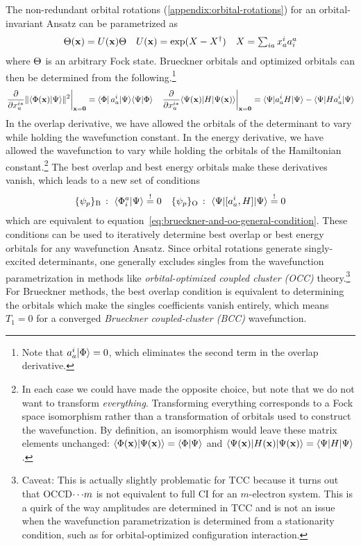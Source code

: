 \documentclass[11pt]{article}
\numberwithin{equation}{section}
\begin{document}
\begin{rmk}
The non-redundant orbital rotations (\cref{appendix:orbital-rotations}) for an orbital-invariant Ansatz can be parametrized as
\begin{align}
  \Theta (\mathbf{x})
=
  U(\mathbf{x})
  \Theta 
&&
  U(\mathbf{x})
=
  \mathrm{exp}(X - X^\dagger)
&&
  X
=
{\textstyle
  \sum_{ia}
  x_a^i
  a^a_i
}
\end{align}
where $\Theta $ is an arbitrary Fock state.
Brueckner orbitals and optimized orbitals can then be determined from the following.\footnote{%
  Note that $a^i_a|\Phi \rangle=0$, which eliminates the second term in the overlap derivative.
}
\begin{align}
\label{eq:brueckner-and-oo-condition-derivatives}
  \left.
  \frac {\partial}{\partial x_a^{i*}}
  \|\langle\Phi (\mathbf{x})|\Psi \rangle\|^2
  \right|_{\mathbf{x}=\mathbf{0}}
=
  \langle\Phi |\,a^i_a|\Psi \rangle
  \langle\Psi |\Phi \rangle
&&
  \left.
  \frac {\partial}{\partial x_a^{i*}}
  \langle\Psi (\mathbf{x})|H|\Psi (\mathbf{x})\rangle
  \right|_{\mathbf{x}=\mathbf{0}}
=
  \langle\Psi |a^i_a H|\Psi \rangle
-
  \langle\Psi |H a^i_a|\Psi \rangle
\end{align}
In the overlap derivative, we have allowed the orbitals of the determinant to vary while holding the wavefunction constant.
In the energy derivative, we have allowed the wavefunction to vary while holding the orbitals of the Hamiltonian constant.\footnote{
  In each case we could have made the opposite choice, but note that we do not want to transform \textit{everything}.
  Transforming everything corresponds to a Fock space isomorphism rather than a transformation of orbitals used to construct the wavefunction.
  By definition, an isomorphism would leave these matrix elements unchanged:
  $
    \langle\Phi (\mathbf{x})|\Psi (\mathbf{x})\rangle
  =
    \langle\Phi |\Psi \rangle
  $
  and
  $
    \langle\Psi (\mathbf{x})|H(\mathbf{x})|\Psi (\mathbf{x})\rangle
  =
    \langle\Psi |H|\Psi \rangle
  $.
}
The best overlap and best energy orbitals make these derivatives vanish, which leads to a new set of conditions
\begin{align}
\label{eq:brueckner-and-oo-explicit-condition}
  \{\psi _p\}_{\mathrm{B}}\,:\,\,
  \langle\Phi _i^a|\Psi \rangle
\overset{!}{=}
  0
&&
  \{\psi _p\}_{\mathrm{O}}\,:\,\,
  \langle\Psi |[a_a^i, H]|\Psi \rangle
\overset{!}{=}
  0
\end{align}
which are equivalent to equation~\ref{eq:brueckner-and-oo-general-condition}.
These conditions can be used to iteratively determine best overlap or best energy orbitals for any wavefunction Ansatz.
Since orbital rotations generate singly-excited determinants, one generally excludes singles from the wavefunction parametrization in methods like \textit{orbital-optimized coupled cluster (OCC)} theory.\footnote{%
  Caveat:
  This is actually slightly problematic for TCC because it turns out that OCCD${\cdots}m$ is not equivalent to full CI for an $m$-electron system.
  This is a quirk of the way amplitudes are determined in TCC and is not an issue when the wavefunction parametrization is determined from a stationarity condition, such as for orbital-optimized configuration interaction.%
}
For Brueckner methods, the best overlap condition is equivalent to determining the orbitals which make the singles coefficients vanish entirely, which means $T_1=0$ for a converged \textit{Brueckner coupled-cluster (BCC)} wavefunction.
\end{rmk}
\end{document}
